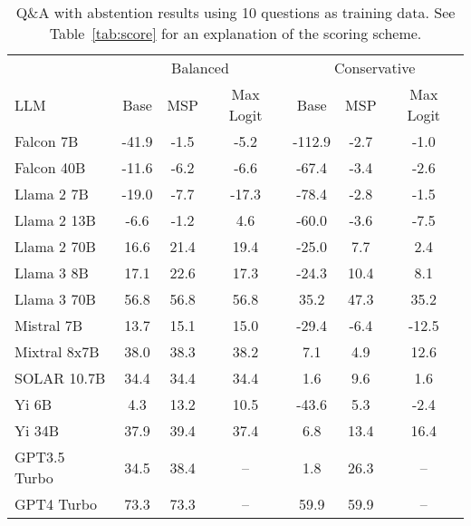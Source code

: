 \begin{table*}[h]
\centering
\caption{Q\&A with abstention results using 10 questions as training data. See Table~\ref{tab:score} for an explanation of the scoring scheme.}
\label{tab:score_k=10}
\begin{tabular}{lcccccc}
\toprule
& \multicolumn{3}{c}{Balanced} & \multicolumn{3}{c}{Conservative} \\ 
LLM & Base & MSP & Max Logit & Base & MSP & Max Logit \\ 
\cmidrule(lr){1-1}\cmidrule(lr){2-4}\cmidrule(lr){5-7} 
Falcon 7B & -41.9 & -1.5 & -5.2 & -112.9 & -2.7 & -1.0\\
Falcon 40B & -11.6 & -6.2 & -6.6 & -67.4 & -3.4 & -2.6\\
Llama 2 7B & -19.0 & -7.7 & -17.3 & -78.4 & -2.8 & -1.5\\
Llama 2 13B & -6.6 & -1.2 & 4.6 & -60.0 & -3.6 & -7.5\\
Llama 2 70B & 16.6 & 21.4 & 19.4 & -25.0 & 7.7 & 2.4\\
Llama 3 8B & 17.1 & 22.6 & 17.3 & -24.3 & 10.4 & 8.1\\
Llama 3 70B & 56.8 & 56.8 & 56.8 & 35.2 & 47.3 & 35.2\\
Mistral 7B & 13.7 & 15.1 & 15.0 & -29.4 & -6.4 & -12.5\\
Mixtral 8x7B & 38.0 & 38.3 & 38.2 & 7.1 & 4.9 & 12.6\\
SOLAR 10.7B & 34.4 & 34.4 & 34.4 & 1.6 & 9.6 & 1.6\\
Yi 6B & 4.3 & 13.2 & 10.5 & -43.6 & 5.3 & -2.4\\
Yi 34B & 37.9 & 39.4 & 37.4 & 6.8 & 13.4 & 16.4\\
GPT3.5 Turbo & 34.5 & 38.4 & -- & 1.8 & 26.3 & --\\
GPT4 Turbo & 73.3 & 73.3 & -- & 59.9 & 59.9 & --\\
\bottomrule
\end{tabular}
\end{table*}
